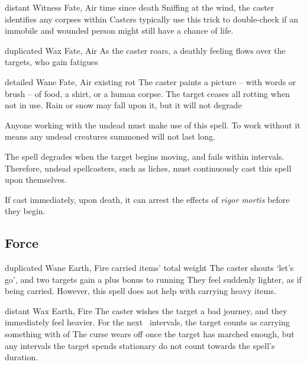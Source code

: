 \begin{multicols}{2}

  {distant}%
  {Witness}%
  {Fate, Air}%
  {time since death}%
  {Sniffing at the wind, the caster identifies any corpses within \spellRange}%
  {
    Casters typically use this trick to double-check if an immobile and wounded person might still have a chance of life.
  }

  {duplicated}%
  {Wax}%
  {Fate, Air}%
  {}%
  {As the caster roars, a deathly feeling flows over the targets, who gain  \glspl{fatigue}}%
  {}

  {detailed}%
  {Wane}%
  {Fate, Air}%
  {existing rot}%
  {The caster paints a picture -- with words or brush -- of food, a shirt, or a human corpse.
  The target ceases all rotting when not in use.
  Rain or snow may fall upon it, but it will not degrade}%
  {
    Anyone working with the undead must make use of this spell.
    To work without it means any undead creatures summoned will not last long.

    The spell degrades when the target begins moving, and fails within  \glspl{interval}.
    Therefore, undead spellcasters, such as liches, must continuously cast this spell upon themselves.

    If cast immediately, upon death, it can arrest the effects of \textit{rigor mortis} before they begin.
  }


\subsection{Force}


  {duplicated}%
  {Wane}%
  {Earth, Fire}%
  {carried items' total \gls{weight}}%
  {The caster shouts `let's go', and two targets gain a plus  bonus to running}%
  {They feel suddenly lighter, as if being carried.
  However, this spell does not help with carrying heavy items.}

  {distant}%
  {Wax}%
  {Earth, Fire}%
  {}%
  {The caster wishes the target a bad journey, and they immediately feel heavier.
  For the next ~\glspl{interval}, the target counts as carrying something with  of }%
  {
  The curse wears off once the target has marched enough, but any \glspl{interval} the target spends stationary do not count towards the spell's duration.}


\end{multicols}
